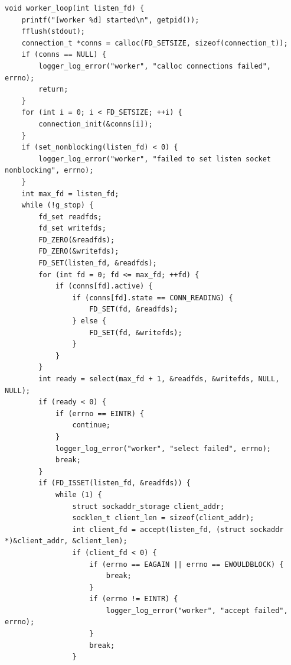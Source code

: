 \begin{lstlisting}[caption={Функция работы worker'а}, label={lst:workerLoop}]
void worker_loop(int listen_fd) {
	printf("[worker %d] started\n", getpid());
	fflush(stdout);
	connection_t *conns = calloc(FD_SETSIZE, sizeof(connection_t));
	if (conns == NULL) {
		logger_log_error("worker", "calloc connections failed", errno);
		return;
	}
	for (int i = 0; i < FD_SETSIZE; ++i) {
		connection_init(&conns[i]);
	}
	if (set_nonblocking(listen_fd) < 0) {
		logger_log_error("worker", "failed to set listen socket nonblocking", errno);
	}
	int max_fd = listen_fd;
	while (!g_stop) {
		fd_set readfds;
		fd_set writefds;
		FD_ZERO(&readfds);
		FD_ZERO(&writefds);
		FD_SET(listen_fd, &readfds);
		for (int fd = 0; fd <= max_fd; ++fd) {
			if (conns[fd].active) {
				if (conns[fd].state == CONN_READING) {
					FD_SET(fd, &readfds);
				} else {
					FD_SET(fd, &writefds);
				}
			}
		}
		int ready = select(max_fd + 1, &readfds, &writefds, NULL, NULL);
		if (ready < 0) {
			if (errno == EINTR) {
				continue;
			}
			logger_log_error("worker", "select failed", errno);
			break;
		}
		if (FD_ISSET(listen_fd, &readfds)) {
			while (1) {
				struct sockaddr_storage client_addr;
				socklen_t client_len = sizeof(client_addr);
				int client_fd = accept(listen_fd, (struct sockaddr *)&client_addr, &client_len);
				if (client_fd < 0) {
					if (errno == EAGAIN || errno == EWOULDBLOCK) {
						break;
					}
					if (errno != EINTR) {
						logger_log_error("worker", "accept failed", errno);
					}
					break;
				}
				

\end{lstlisting}
